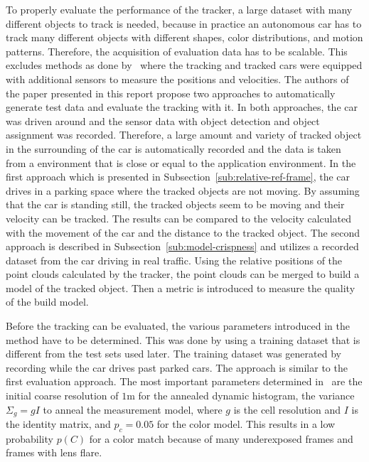 \documentclass[twoside,a4paper,article]{combine}
\begin{document}
To properly evaluate the performance of the tracker, a large dataset
with many different objects to track is needed, because in practice an
autonomous car has to track many different objects with different
shapes, color distributions, and motion patterns. Therefore, the
acquisition of evaluation data has to be scalable. This excludes
methods as done by~\cite{unscalable-eval} where the tracking and
tracked cars were equipped with additional sensors to measure the
positions and velocities. The authors of the paper presented in this
report propose two approaches to automatically generate test data and
evaluate the tracking with it. In both approaches, the car was driven
around and the sensor data with object detection and object assignment
was recorded. Therefore, a large amount and variety of tracked object
in the surrounding of the car is automatically recorded and the data
is taken from a environment that is close or equal to the application
environment. In the first approach which is presented in
Subsection~\ref{sub:relative-ref-frame}, the car drives in a
parking space where the tracked objects are not moving. By assuming
that the car is standing still, the tracked objects seem to be
moving and their  velocity can be tracked. The results can
be compared to the velocity calculated with the movement of the car and the
distance to the tracked object. The second approach is described in
Subsection~\ref{sub:model-crispness} and utilizes a recorded dataset
from the car driving in real traffic. Using the relative positions of
the point clouds calculated by the tracker, the point clouds can be
merged to build a model of the tracked object. Then a metric is
introduced to measure the quality of the build model.

Before the tracking can be evaluated, the various parameters
introduced in the method have to be determined. This was done by using
a training dataset that is different from the test sets used
later. The training dataset was generated by recording while the car
drives past parked cars. The approach is similar to the first
evaluation approach. The most important parameters determined
in~\cite{paper} are the initial coarse resolution of $1$m for the
annealed dynamic histogram, the variance $\Sigma_g=gI$ to anneal the
measurement model, where $g$ is the cell resolution and $I$ is the
identity matrix, and $p_c=0.05$ for the color model. This results in a
low probability $p(C)$ for a color match because of many underexposed
frames and frames with lens flare.
\end{document}
